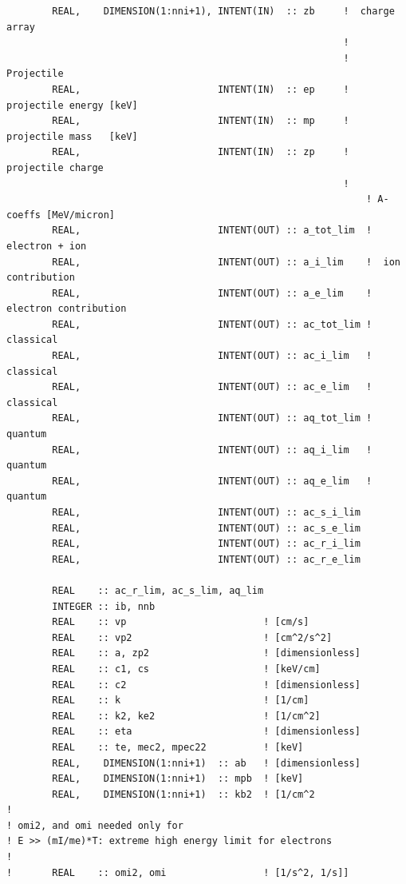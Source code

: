 \documentclass[preprint,12pt,eqsecnum,nofootinbib,amsmath,amssymb]{revtex4}
\begin{document}
{\begin{verbatim}
        REAL,    DIMENSION(1:nni+1), INTENT(IN)  :: zb     !  charge array
                                                           !
                                                           ! Projectile  
        REAL,                        INTENT(IN)  :: ep     !  projectile energy [keV]
        REAL,                        INTENT(IN)  :: mp     !  projectile mass   [keV]
        REAL,                        INTENT(IN)  :: zp     !  projectile charge
                                                           !
                                                               ! A-coeffs [MeV/micron]
        REAL,                        INTENT(OUT) :: a_tot_lim  !  electron + ion
        REAL,                        INTENT(OUT) :: a_i_lim    !  ion contribution
        REAL,                        INTENT(OUT) :: a_e_lim    !  electron contribution
        REAL,                        INTENT(OUT) :: ac_tot_lim !  classical
        REAL,                        INTENT(OUT) :: ac_i_lim   !  classical
        REAL,                        INTENT(OUT) :: ac_e_lim   !  classical
        REAL,                        INTENT(OUT) :: aq_tot_lim !  quantum
        REAL,                        INTENT(OUT) :: aq_i_lim   !  quantum
        REAL,                        INTENT(OUT) :: aq_e_lim   !  quantum
        REAL,                        INTENT(OUT) :: ac_s_i_lim
        REAL,                        INTENT(OUT) :: ac_s_e_lim
        REAL,                        INTENT(OUT) :: ac_r_i_lim
        REAL,                        INTENT(OUT) :: ac_r_e_lim

        REAL    :: ac_r_lim, ac_s_lim, aq_lim
        INTEGER :: ib, nnb
        REAL    :: vp                        ! [cm/s]
        REAL    :: vp2                       ! [cm^2/s^2]
        REAL    :: a, zp2                    ! [dimensionless]
        REAL    :: c1, cs                    ! [keV/cm]
        REAL    :: c2                        ! [dimensionless]
        REAL    :: k                         ! [1/cm]
        REAL    :: k2, ke2                   ! [1/cm^2]
        REAL    :: eta                       ! [dimensionless]
        REAL    :: te, mec2, mpec22          ! [keV] 
        REAL,    DIMENSION(1:nni+1)  :: ab   ! [dimensionless]
        REAL,    DIMENSION(1:nni+1)  :: mpb  ! [keV]
        REAL,    DIMENSION(1:nni+1)  :: kb2  ! [1/cm^2
!
! omi2, and omi needed only for 
! E >> (mI/me)*T: extreme high energy limit for electrons
!
!       REAL    :: omi2, omi                 ! [1/s^2, 1/s]]


\end{verbatim}}
\end{document}
